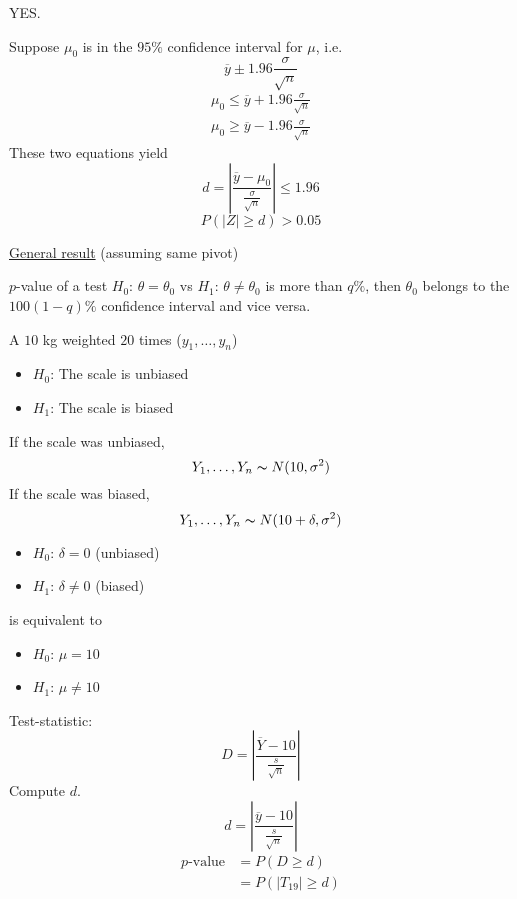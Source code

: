 YES.

Suppose $ \mu_0 $ is in the $ 95\% $ confidence interval for $ \mu $, i.e.
\[ \overline{y}\pm 1.96 \frac{\sigma}{\sqrt{n}} \]
\[ \begin{aligned}
        \mu_0\leqslant \overline{y}+1.96 \frac{\sigma}{\sqrt{n}} \\
        \mu_0\geqslant \overline{y}-1.96 \frac{\sigma}{\sqrt{n}}
    \end{aligned}
\]
These two equations yield
\[ d=\left|\frac{\overline{y}-\mu_0}{\frac{\sigma}{\sqrt{n}}} \right|\leqslant 1.96 \]
\[ P(|Z|\geqslant d)>0.05 \]

\underline{General result} (assuming same pivot)

$ p $-value of a test $ H_0 $: $ \theta=\theta_0 $ vs $ H_1 $: $ \theta\neq \theta_0 $
is more than $ q\% $, then $ \theta_0 $ belongs to the $ 100(1-q)\% $
confidence interval and vice versa.

\begin{exbox}
    \begin{example}[Bias]
        A $ 10 $ kg weighted $ 20 $ times ($ y_1,\ldots ,y_n $)
        \begin{itemize}
            \item $ H_0 $: The scale is unbiased
            \item $ H_1 $: The scale is biased
        \end{itemize}
        If the scale was unbiased,
        \[ Y_1,\ldots ,Y_n \thicksim N(10,\sigma^2) \]
        If the scale was biased,
        \[ Y_1,\ldots ,Y_n \thicksim N(10+\delta,\sigma^2) \]
        \begin{itemize}
            \item $ H_0 $: $ \delta=0 $ (unbiased)
            \item $ H_1 $: $ \delta\neq 0 $ (biased)
        \end{itemize}
        is equivalent to
        \begin{itemize}
            \item $ H_0 $: $ \mu=10 $
            \item $ H_1 $: $ \mu\neq 10 $
        \end{itemize}
        Test-statistic:
        \[ D=\left|\frac{\overline{Y}-10}{\frac{s}{\sqrt{n}}} \right| \]
        Compute $ d $.
        \[ d=
            \left|\frac{\overline{y}-10}{\frac{s}{\sqrt{n}}} \right| \]
        \[
            \begin{aligned}
                p\text{-value}
                 & =P(D\geqslant d)        \\
                 & =P(|T_{19}|\geqslant d)
            \end{aligned}
        \]
    \end{example}
\end{exbox}

